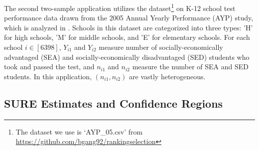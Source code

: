 \documentclass[12pt,letterpaper]{article}
\begin{document}
 The second two-sample application utilizes the dataset\footnote{The dataset we use is `AYP\_05.csv' from \url{https://github.com/bgang92/rankingselection}} on K-12 school test performance data drawn from the 2005 Annual Yearly Performance (AYP) study, which is analyzed in \cite{gang2023ranking}. Schools in this dataset are categorized into three types: 'H' for high schools, 'M' for middle schools, and 'E' for elementary schools. For each school $i\in[6398]$, $Y_{i1}$ and $Y_{i2}$ measure number of socially-economically advantaged (SEA) and socially-economically disadvantaged (SED) students who took and passed the test, and $n_{i1}$ and $n_{i2}$ measure the number of SEA and SED students. In this application, $(n_{i1}, n_{i2})$ are vastly heterogeneous. 



\subsection{SURE Estimates and Confidence Regions}
\end{document}
